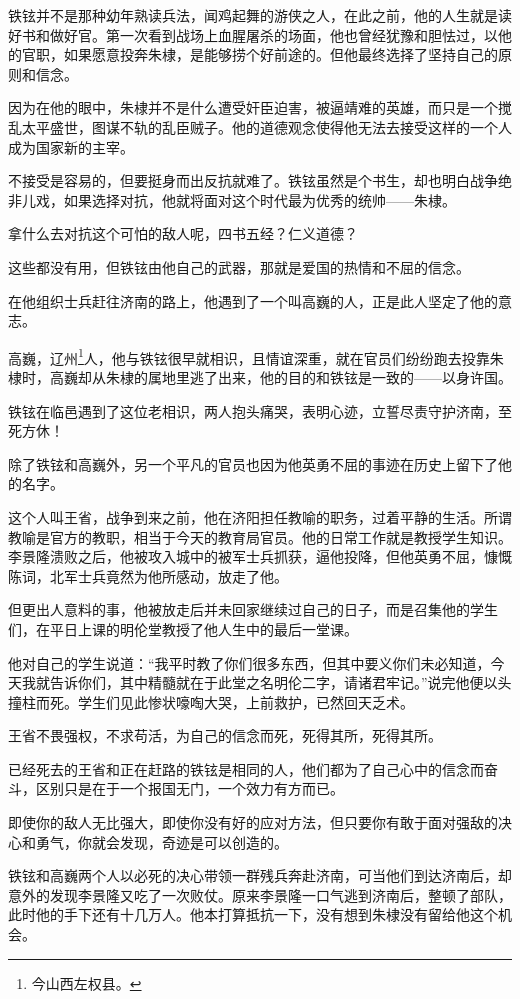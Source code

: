 \begin{multicols}{\theparacolNo}
		铁铉并不是那种幼年熟读兵法，闻鸡起舞的游侠之人，在此之前，他的人生就是读好书和做好官。第一次看到战场上血腥屠杀的场面，他也曾经犹豫和胆怯过，以他的官职，如果愿意投奔朱棣，是能够捞个好前途的。但他最终选择了坚持自己的原则和信念。

		因为在他的眼中，朱棣并不是什么遭受奸臣迫害，被逼靖难的英雄，而只是一个搅乱太平盛世，图谋不轨的乱臣贼子。他的道德观念使得他无法去接受这样的一个人成为国家新的主宰。

		不接受是容易的，但要挺身而出反抗就难了。铁铉虽然是个书生，却也明白战争绝非儿戏，如果选择对抗，他就将面对这个时代最为优秀的统帅——朱棣。

		拿什么去对抗这个可怕的敌人呢，四书五经？仁义道德？

		这些都没有用，但铁铉由他自己的武器，那就是爱国的热情和不屈的信念。

		在他组织士兵赶往济南的路上，他遇到了一个叫高巍的人，正是此人坚定了他的意志。

		高巍，辽州\footnote{今山西左权县。}人，他与铁铉很早就相识，且情谊深重，就在官员们纷纷跑去投靠朱棣时，高巍却从朱棣的属地里逃了出来，他的目的和铁铉是一致的——以身许国。

		铁铉在临邑遇到了这位老相识，两人抱头痛哭，表明心迹，立誓尽责守护济南，至死方休！

		除了铁铉和高巍外，另一个平凡的官员也因为他英勇不屈的事迹在历史上留下了他的名字。

		这个人叫王省，战争到来之前，他在济阳担任教喻的职务，过着平静的生活。所谓教喻是官方的教职，相当于今天的教育局官员。他的日常工作就是教授学生知识。李景隆溃败之后，他被攻入城中的被军士兵抓获，逼他投降，但他英勇不屈，慷慨陈词，北军士兵竟然为他所感动，放走了他。

		但更出人意料的事，他被放走后并未回家继续过自己的日子，而是召集他的学生们，在平日上课的明伦堂教授了他人生中的最后一堂课。

		他对自己的学生说道：“我平时教了你们很多东西，但其中要义你们未必知道，今天我就告诉你们，其中精髓就在于此堂之名明伦二字，请诸君牢记。”说完他便以头撞柱而死。学生们见此惨状嚎啕大哭，上前救护，已然回天乏术。

		王省不畏强权，不求苟活，为自己的信念而死，死得其所，死得其所。

		已经死去的王省和正在赶路的铁铉是相同的人，他们都为了自己心中的信念而奋斗，区别只是在于一个报国无门，一个效力有方而已。

		即使你的敌人无比强大，即使你没有好的应对方法，但只要你有敢于面对强敌的决心和勇气，你就会发现，奇迹是可以创造的。

		铁铉和高巍两个人以必死的决心带领一群残兵奔赴济南，可当他们到达济南后，却意外的发现李景隆又吃了一次败仗。原来李景隆一口气逃到济南后，整顿了部队，此时他的手下还有十几万人。他本打算抵抗一下，没有想到朱棣没有留给他这个机会。


\end{multicols}
